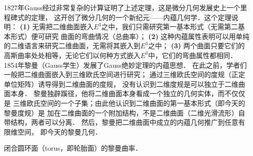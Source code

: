 1827年Gauss经过非常复杂的计算证明了上述定理，这是微分几何发展史上一个里程碑式的定理，
这开创了微分几何的一个新纪元——内蕴几何学．这个定理说明：
{\bfseries (1)} 无需把二维曲面嵌入$E^3$之中，我们只需研究第一基本形式（无需第二基本形式）便可研究
曲面的{\kaishu 弯曲情况}（总曲率）；
{\bfseries (2)} 这种{\kaishu 内蕴}属性表明可以用单纯的二维语言来研究二维曲面，无需将其嵌入到$E^3$之中；
{\bfseries (3)} 两个曲面只要它们的高斯曲率处处相等，无论它们以何种方式嵌入$E^3$中，它们的弯曲属性都相同．
1854年黎曼（Gauss学生）发展了Gauss绝妙定理的内蕴思想．
在此之前，学者们一般把二维曲面嵌入到三维欧氏空间进行研究；
通过三维欧氏空间的度规（正定单位矩阵）诱导得到二维曲面的度规，
没有认识到二维度规是可以独立于二维曲面本身．
黎曼独辟蹊径，他将二维曲面本身看成一个独立的几何实体，而不仅仅是
三维欧氏空间的一个子集；由此他认识到二维曲面的第一基本形式（即今天的黎曼度规）是
加在二维曲面的一个附加结构，不是二维曲面（二维光滑流形）自带结构，两者可以分离．
然后，黎曼把二维曲面中成立的内蕴几何推广到任意有限维空间，
即今天的{\kaishu 黎曼几何}．

\begin{example}\label{chcdg:exm_torus}
	闭合圆环面（torus，即轮胎面）的黎曼曲率．
\end{example}

